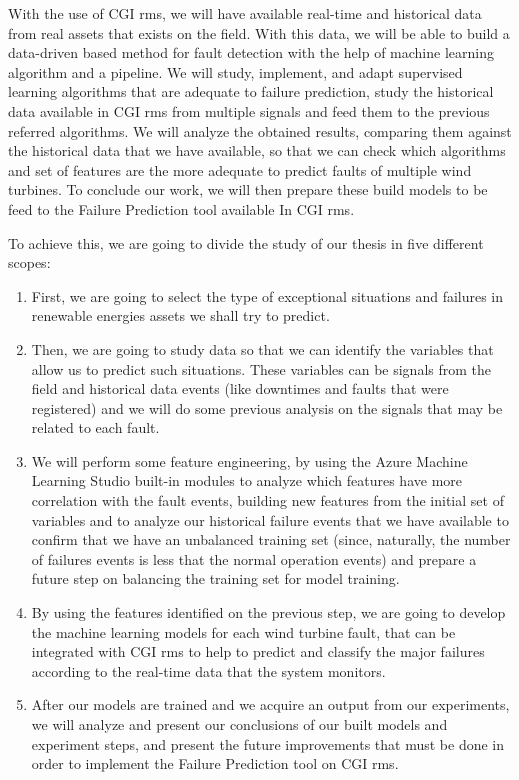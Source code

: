 With the use of CGI \acrshort{rms}, we will have available real-time and historical data from real assets that exists on the field. With this data, we will be able to build a data-driven based method for fault detection with the help of machine learning algorithm and a pipeline. We will study, implement, and adapt supervised learning algorithms that are adequate to failure prediction, study the historical data available in CGI \acrshort{rms} from multiple signals and feed them to the previous referred algorithms. We will analyze the obtained results, comparing them against the historical data that we have available, so that we can check which algorithms and set of features are the more adequate to predict faults of multiple wind turbines. To conclude our work, we will then prepare these build models to be feed to the Failure Prediction tool available In CGI \acrshort{rms}.

To achieve this, we are going to divide the study of our thesis in five different scopes:

\begin{enumerate}
\item 
First, we are going to select the type of exceptional situations and failures in renewable energies assets we shall try to predict.

\item 
Then, we are going to study data so that we can identify the variables that allow us to predict such situations. These variables can be signals from the field and historical data events (like downtimes and faults that were registered) and we will do some previous analysis on the signals that may be related to each fault.

\item
We will perform some feature engineering, by using the Azure Machine Learning Studio built-in modules to analyze which features have more correlation with the fault events, building new features from the initial set of variables and to analyze our historical failure events that we have available to confirm that we have an unbalanced training set (since, naturally, the number of failures events is less that the normal operation events) and prepare a future step on balancing the training set for model training.

\item 
By using the features identified on the previous step, we are going to develop the machine learning models for each wind turbine fault, that can be integrated with CGI \acrshort{rms} to help to predict and classify the major failures according to the real-time data that the system monitors.

\item 
After our models are trained and we acquire an output from our experiments, we will analyze and present our conclusions of our built models and experiment steps, and present the future improvements that must be done in order to implement the Failure Prediction tool on CGI \acrshort{rms}.

\end{enumerate}

